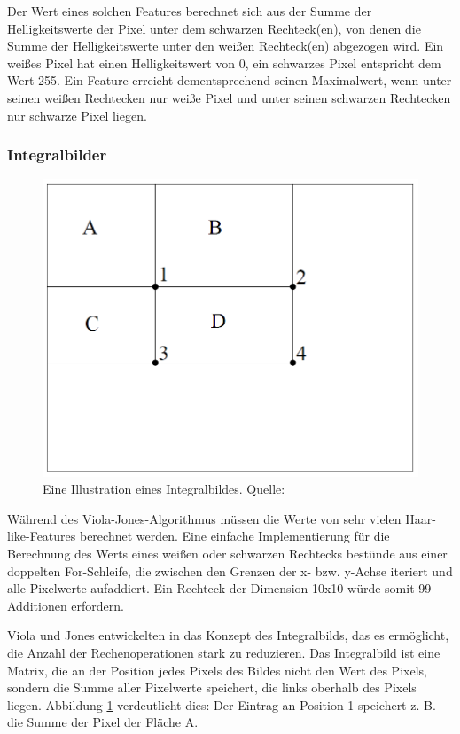 \documentclass[doktyp=semarbeit, sprache=german]{TUBAFarbeiten}
\begin{document}
Der Wert eines solchen Features berechnet sich aus der Summe der Helligkeitswerte der Pixel unter dem schwarzen Rechteck(en), von denen die Summe der Helligkeitswerte unter den weißen Rechteck(en) abgezogen wird. Ein weißes Pixel hat einen Helligkeitswert von 0, ein schwarzes Pixel entspricht dem Wert 255. Ein Feature erreicht dementsprechend seinen Maximalwert, wenn unter seinen weißen Rechtecken nur weiße Pixel und unter seinen schwarzen Rechtecken nur schwarze Pixel liegen.

\subsubsection{Integralbilder}

\begin{figure}
	\centering
	\includegraphics[width=0.7\linewidth]{images/integral}
	\caption[Integralbild]{Eine Illustration eines Integralbildes. Quelle: \cite{Viola01rapidobject}}
	\label{fig:integral}
\end{figure}


Während des Viola-Jones-Algorithmus müssen die Werte von sehr vielen Haar-like-Features berechnet werden. Eine einfache Implementierung für die Berechnung des Werts eines weißen oder schwarzen Rechtecks bestünde aus einer doppelten For-Schleife, die zwischen den Grenzen der x- bzw. y-Achse iteriert und alle Pixelwerte aufaddiert. Ein Rechteck der Dimension 10x10 würde somit 99 Additionen erfordern.

Viola und Jones entwickelten in \cite{Viola01rapidobject} das Konzept des Integralbilds, das es ermöglicht, die Anzahl der Rechenoperationen stark zu reduzieren. Das Integralbild ist eine Matrix, die an der Position jedes Pixels des Bildes nicht den Wert des Pixels, sondern die Summe aller Pixelwerte speichert, die links oberhalb des Pixels liegen. Abbildung \ref{fig:integral} verdeutlicht dies: Der Eintrag an Position 1 speichert z. B. die Summe der Pixel der Fläche A.
\end{document}
